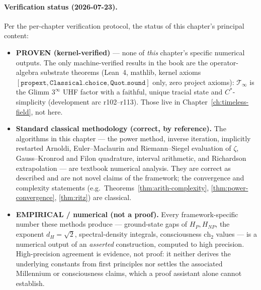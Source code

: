 \paragraph{Verification status (2026-07-23).}
Per the per-chapter verification protocol, the status of this chapter's principal content:
\begin{itemize}
\item \textbf{PROVEN (kernel-verified)} --- none of \emph{this} chapter's specific numerical outputs. The only machine-verified results in the book are the operator-algebra substrate theorems (Lean~4, mathlib, kernel axioms $[\texttt{propext}, \texttt{Classical.choice}, \texttt{Quot.sound}]$ only, zero project axioms): $\mathcal{T}_\infty$ is the Glimm $3^\infty$ UHF factor with a faithful, unique tracial state and $C^*$-simplicity (development arc r102--r113). Those live in Chapter~\ref{ch:timeless-field}, not here.
\item \textbf{Standard classical methodology (correct, by reference).} The algorithms in this chapter --- the power method, inverse iteration, implicitly restarted Arnoldi, Euler--Maclaurin and Riemann--Siegel evaluation of $\zeta$, Gauss--Kronrod and Filon quadrature, interval arithmetic, and Richardson extrapolation --- are textbook numerical analysis. They are correct as described and are not novel claims of the framework; the convergence and complexity statements (e.g.\ Theorems~\ref{thm:arith-complexity}, \ref{thm:power-convergence}, \ref{thm:ritz}) are classical.
\item \textbf{EMPIRICAL / numerical (not a proof).} Every framework-specific number these methods produce --- ground-state gaps of $H_P, H_{NP}$, the exponent $d_H=\sqrt{2}$, spectral-density integrals, consciousness $\text{ch}_2$ values --- is a numerical output of an \emph{asserted} construction, computed to high precision. High-precision agreement is evidence, not proof: it neither derives the underlying constants from first principles nor settles the associated Millennium or consciousness claims, which a proof assistant alone cannot establish.
\end{itemize}
